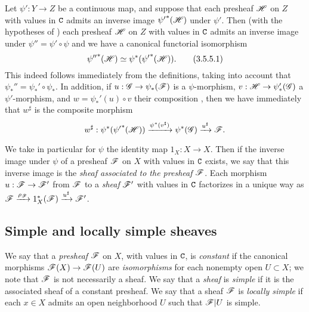 \begin{env}[3.5.5]
\label{0.3.5.5}
Let $\psi':Y\to Z$ be a continuous map, and suppose that each presheaf $\mathscr{H}$
on $Z$ with values in $\mathtt{C}$ admits an inverse image ${\psi'}^*(\mathscr{H})$ under
$\psi'$. Then (with the hypotheses of ) each presheaf $\mathscr{H}$
on $Z$ with values in $\mathtt{C}$ admits an inverse image under $\psi''=\psi'\circ\psi$
and we have a canonical functorial isomorphism
\[
  {\psi''}^*(\mathscr{H})\simeq\psi^*({\psi'}^*(\mathscr{H})).
  \tag{3.5.5.1}
\]
This indeed follows immediately from the definitions, taking into account that
$\psi_*''=\psi_*'\circ\psi_*$. In addition, if $u:\sh{G}\to\psi_*(\sh{F})$ is a
$\psi$-morphism, $v:\sh{H}\to\psi_*'(\sh{G})$ a $\psi'$-morphism, and
$w=\psi_*'(u)\circ v$ their composition , then we have
immediately that $w^\sharp$ is the composite morphism
\[
  w^\sharp:\psi^*({\psi'}^*(\mathscr{H}))\xrightarrow{\psi^*(v^\sharp)}\psi^*(\mathscr{G})\xrightarrow{u^\sharp}\mathscr{F}.
\]
\end{env}

\begin{env}[3.5.6]
\label{0.3.5.6}
We take in particular for $\psi$ the identity map $1_X:X\to X$. Then if the
inverse image under $\psi$ of a presheaf $\mathscr{F}$ on $X$ with values in $\mathtt{C}$
exists, we say that this inverse image is the \emph{sheaf associated to the
presheaf $\mathscr{F}$}. Each morphism $u:\sh{F}\to\sh{F}'$ from $\mathscr{F}$ to a
\emph{sheaf} $\mathscr{F}'$ with values in $\mathtt{C}$ factorizes in a unique way as
$\mathscr{F}\xrightarrow{\rho_\mathscr{F}}1_X^*(\mathscr{F})\xrightarrow{u^\sharp}\mathscr{F}'$.
\end{env}

\subsection{Simple and locally simple sheaves}
\label{subsection:0.3.6}

\begin{env}[3.6.1]
\label{0.3.6.1}
We say that a \emph{presheaf} $\mathscr{F}$ on $X$, with values in $\mathtt{C}$, is
\emph{constant} if the canonical morphisms $\sh{F}(X)\to\sh{F}(U)$ are
\emph{isomorphisms} for each nonempty open $U\subset X$; we note that $\mathscr{F}$
is not necessarily a sheaf. We say that a \emph{sheaf} is \emph{simple} if it is
the associated sheaf  of a constant presheaf. We say that a
sheaf $\mathscr{F}$ is \emph{locally simple} if each $x\in X$ admits an open
neighborhood $U$ such that $\mathscr{F}|U$ is simple.
\end{env}

